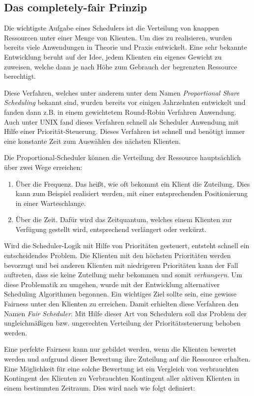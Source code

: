 \subsection{Das completely-fair Prinzip}\label{s:fair}
Die wichtigste Aufgabe eines Schedulers ist die Verteilung von knappen Ressourcen unter einer Menge von Klienten. 
Um dies zu realisieren, wurden bereits viele Anwendungen in Theorie und Praxis entwickelt.
Eine sehr bekannte Entwicklung beruht auf der Idee, jedem Klienten ein eigenes Gewicht zu zuweisen, welche dann je nach Höhe zum Gebrauch der begrenzten Ressource berechtigt.

Diese Verfahren, welches unter anderem unter dem Namen \textit{Proportional Share Scheduling} bekannt sind, wurden bereits vor einigen Jahrzehnten entwickelt und fanden dann z.B. in einem gewichtetem Round-Robin Verfahren Anwendung. Auch unter UNIX fand dieses Verfahren schnell als Scheduler Anwendung mit Hilfe einer Priorität-Steuer\-ung. Dieses Verfahren ist schnell und benötigt immer eine konstante Zeit zum Auswählen des nächsten Klienten. 

Die Proportional-Scheduler können die Verteilung der Ressource hauptsächlich über zwei Wege erreichen:
\begin{enumerate}
	\item Über die Frequenz. Das heißt, wie oft bekommt ein Klient die Zuteilung. Dies kann zum Beispiel realisiert werden, mit einer entsprechenden Positionierung in einer Warteschlange.
	\item Über die Zeit. Dafür wird das Zeitquantum, welches einem Klienten zur Verfügung gestellt wird, entsprechend verlängert oder verkürzt.
\end{enumerate}

Wird die Scheduler-Logik mit Hilfe von Prioritäten gesteuert, entsteht schnell ein entscheidendes Problem. Die Klienten mit den höchsten Prioritäten werden bevorzugt und bei anderen Klienten mit niedrigeren Prioritäten kann der Fall auftreten, dass sie keine Zuteilung mehr bekommen und somit \textit{verhungern}.
Um diese Problematik zu umgehen, wurde mit der Entwicklung alternativer Scheduling Algorithmen begonnen. Ein wichtiges Ziel sollte sein, eine gewisse Fairness unter den Klienten zu erreichen. Damit erhielten diese Verfahren den Namen \textit{Fair Scheduler}. Mit Hilfe dieser Art von Schedulern soll das Problem der ungleichmäßigen bzw. ungerechten Verteilung der Prioritätssteuerung behoben werden.

Eine perfekte Fairness kann nur gebildet werden, wenn die Klienten bewertet werden und aufgrund dieser Bewertung ihre Zuteilung auf die Ressource erhalten.
Eine Möglichkeit für eine solche Bewertung ist ein Vergleich von verbrauchten Kontingent des Klienten zu Verbrauchten Kontingent aller aktiven Klienten in einem bestimmten Zeitraum. 
Dies wird nach \cite{usenix} wie folgt definiert:

